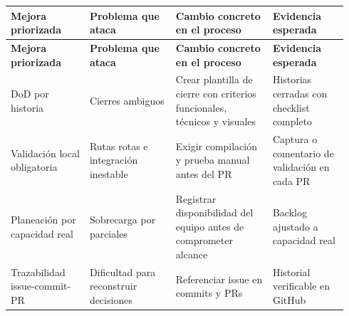 \documentclass[11pt,a4paper]{article}
\begin{document}
\begingroup
\scriptsize
\setlength{\tabcolsep}{3pt}
\begin{longtable}{P{0.22\linewidth}P{0.24\linewidth}P{0.27\linewidth}P{0.21\linewidth}}
\toprule
\textbf{Mejora priorizada} & \textbf{Problema que ataca} & \textbf{Cambio concreto en el proceso} & \textbf{Evidencia esperada} \\
\midrule
\endfirsthead
\toprule
\textbf{Mejora priorizada} & \textbf{Problema que ataca} & \textbf{Cambio concreto en el proceso} & \textbf{Evidencia esperada} \\
\midrule
\endhead
\bottomrule
\endlastfoot
DoD por historia & Cierres ambiguos & Crear plantilla de cierre con criterios funcionales, técnicos y visuales & Historias cerradas con checklist completo \\
Validación local obligatoria & Rutas rotas e integración inestable & Exigir compilación y prueba manual antes del PR & Captura o comentario de validación en cada PR \\
Planeación por capacidad real & Sobrecarga por parciales & Registrar disponibilidad del equipo antes de comprometer alcance & Backlog ajustado a capacidad real \\
Trazabilidad issue-commit-PR & Dificultad para reconstruir decisiones & Referenciar issue en commits y PRs & Historial verificable en GitHub \\
\end{longtable}
\endgroup
\end{document}
